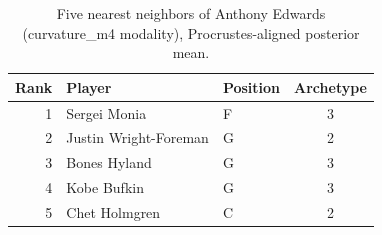 \begin{table}[htbp]
  \centering\small
  \begin{tabular}{rllc}
    \toprule
    Rank & Player & Position & Archetype \\
    \midrule
    1 & Sergei Monia & F & 3 \\
    2 & Justin Wright-Foreman & G & 2 \\
    3 & Bones Hyland & G & 3 \\
    4 & Kobe Bufkin & G & 3 \\
    5 & Chet Holmgren & C & 2 \\
    \bottomrule
  \end{tabular}
  \caption{Five nearest neighbors of Anthony Edwards (curvature_m4 modality), Procrustes-aligned posterior mean.}
  \label{tab:Anthony_Edwards_neighbors_curvature_m4}
\end{table}


